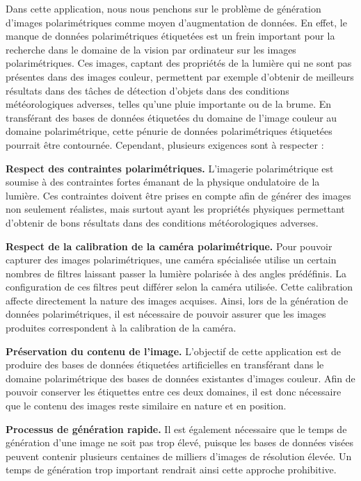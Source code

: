 {\quad Dans cette application, nous nous penchons sur le problème de génération d'images polarimétriques comme moyen d'augmentation de données. En effet, le manque de données polarimétriques étiquetées est un frein important pour la recherche dans le domaine de la vision par ordinateur sur les images polarimétriques. Ces images, captant des propriétés de la lumière qui ne sont pas présentes dans des images couleur, permettent par exemple d'obtenir de meilleurs résultats dans des tâches de détection d'objets dans des conditions météorologiques adverses, telles qu'une pluie importante ou de la brume. En transférant des bases de données étiquetées du domaine de l'image couleur au domaine polarimétrique, cette pénurie de données polarimétriques étiquetées pourrait être  contournée. Cependant, plusieurs exigences sont à respecter :

\textbf{Respect des contraintes polarimétriques.} L'imagerie polarimétrique est soumise à des contraintes fortes émanant de la physique ondulatoire de la lumière. Ces contraintes doivent être prises en compte afin de générer des images non seulement réalistes, mais surtout ayant les  propriétés physiques permettant d'obtenir de bons résultats dans des conditions météorologiques adverses.

\textbf{Respect de la calibration de la caméra polarimétrique.} Pour pouvoir capturer des images polarimétriques, une caméra spécialisée utilise un certain nombres de filtres laissant passer la lumière polarisée à des angles prédéfinis. La configuration de ces filtres peut différer selon la caméra utilisée. Cette calibration affecte directement la nature des images acquises. Ainsi, lors de la génération de données polarimétriques, il est nécessaire de pouvoir assurer que les images produites correspondent à la calibration de la caméra.

\textbf{Préservation du contenu de l'image.} L'objectif de cette application est de produire des bases de données étiquetées artificielles en transférant dans le domaine polarimétrique des bases de données existantes d'images couleur. Afin de pouvoir conserver les étiquettes entre ces deux domaines, il est donc nécessaire que le contenu des images reste similaire en nature et en position.

\textbf{Processus de génération rapide.} Il est également nécessaire que le temps de génération d'une image ne soit pas trop élevé, puisque les bases de données visées peuvent contenir plusieurs centaines de milliers d'images de résolution élevée. Un temps de génération trop important rendrait ainsi cette approche prohibitive.


}
